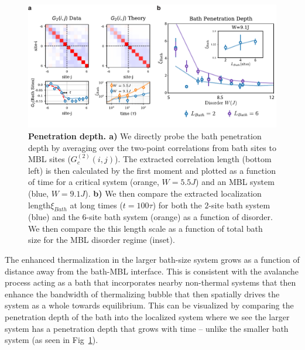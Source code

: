  \begin{figure}[t!]
		\includegraphics[width=\columnwidth]{figures/ch7/bathfig.pdf} 
		\caption{\textbf{Penetration depth. a)} We directly probe the bath penetration depth by averaging over the two-point correlations from bath sites to MBL sites ($G^{(2)}_c(i,j)$). The extracted correlation length (bottom left) is then calculated by the first moment and plotted as a function of time for a critical system (orange, $W=5.5J$) and an MBL system (blue, $W=9.1J$). \textbf{b)}  We then compare the extracted localization length$\xi_{Bath}$ at long times ($t=100\tau$) for both the $2$-site bath system (blue) and the $6$-site bath system (orange) as a function of disorder. We then compare the this length scale as a function of total bath size for the MBL disorder regime (inset).}
		\label{fig:bath_depth}	
\end{figure}

The enhanced thermalization in the larger bath-size system grows as a function of distance away from the bath-MBL interface. This is consistent with the avalanche process acting as a bath that incorporates nearby non-thermal systems that then enhance the bandwidth of thermalizing bubble that then spatially drives the system as a whole towards equilibrium. This can be visualized by comparing the penetration depth of the bath into the localized system where we see the larger system has a penetration depth that grows with time -- unlike the smaller bath system (as seen in Fig~\ref{fig:bath_depth}).

